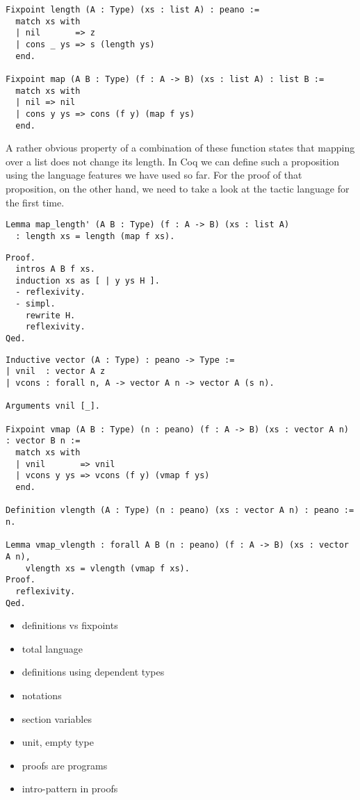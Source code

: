 \begin{verbatim}
Fixpoint length (A : Type) (xs : list A) : peano :=
  match xs with
  | nil       => z
  | cons _ ys => s (length ys)
  end.

Fixpoint map (A B : Type) (f : A -> B) (xs : list A) : list B :=
  match xs with
  | nil => nil
  | cons y ys => cons (f y) (map f ys)
  end.
\end{verbatim}

A rather obvious property of a combination of these function states that mapping over a list does not change its length.
In Coq we can define such a proposition using the language features we have used so far.
For the proof of that proposition, on the other hand, we need to take a look at the tactic language  for the first time.

\begin{verbatim}
Lemma map_length' (A B : Type) (f : A -> B) (xs : list A)
  : length xs = length (map f xs).
\end{verbatim}

\begin{verbatim}
Proof.
  intros A B f xs.
  induction xs as [ | y ys H ].
  - reflexivity.
  - simpl.
    rewrite H.
    reflexivity.
Qed.
\end{verbatim}

\begin{verbatim}
Inductive vector (A : Type) : peano -> Type :=
| vnil  : vector A z
| vcons : forall n, A -> vector A n -> vector A (s n).

Arguments vnil [_].

Fixpoint vmap (A B : Type) (n : peano) (f : A -> B) (xs : vector A n) : vector B n :=
  match xs with
  | vnil       => vnil
  | vcons y ys => vcons (f y) (vmap f ys)
  end.

Definition vlength (A : Type) (n : peano) (xs : vector A n) : peano := n.

Lemma vmap_vlength : forall A B (n : peano) (f : A -> B) (xs : vector A n),
    vlength xs = vlength (vmap f xs).
Proof.
  reflexivity.
Qed.
\end{verbatim}

%
%

\begin{itemize}

\item definitions vs fixpoints
\item total language
\item definitions using dependent types
\item notations
\item section variables
\item unit, empty type
\item proofs are programs
\item intro-pattern in proofs

\end{itemize}
